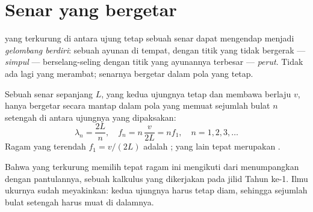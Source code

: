 \section{Senar yang bergetar}

\begin{definition}\label{def:g12:sound-acoustics:standing-wave}
 yang terkurung di antara ujung tetap sebuah senar dapat
mengendap menjadi \emph{gelombang berdiri}:
sebuah ayunan di tempat, dengan titik yang tidak bergerak ---
\emph{simpul} --- berselang-seling dengan titik yang
ayunannya terbesar --- \emph{perut}. Tidak ada lagi yang
merambat; senarnya bergetar dalam pola yang tetap.
\end{definition}

\begin{proposition}\label{prop:g12:sound-acoustics:string-modes}
Sebuah senar sepanjang $L$, yang kedua ujungnya tetap dan membawa
 berlaju $v$, hanya bergetar secara mantap dalam pola yang
memuat sejumlah bulat $n$ setengah  di antara 
ujungnya yang dipaksakan:
\[ \lambda_n = \frac{2L}{n}, \quad f_n = n\,\frac{v}{2L} = n f_1, \quad n = 1, 2, 3, \dots \]
Ragam yang terendah $f_1 = v/(2L)$ adalah ; yang lain
tepat merupakan . \admitted
\end{proposition}

\begin{remark}\label{rem:g12:sound-acoustics:honest}
Bahwa  yang terkurung memilih tepat ragam ini mengikuti dari
menumpangkan  dengan pantulannya, sebuah kalkulus yang
dikerjakan pada jilid Tahun ke-1. Ilmu ukurnya sudah meyakinkan: kedua
ujungnya harus tetap diam, sehingga sejumlah bulat setengah  harus muat di dalamnya.
\end{remark}

